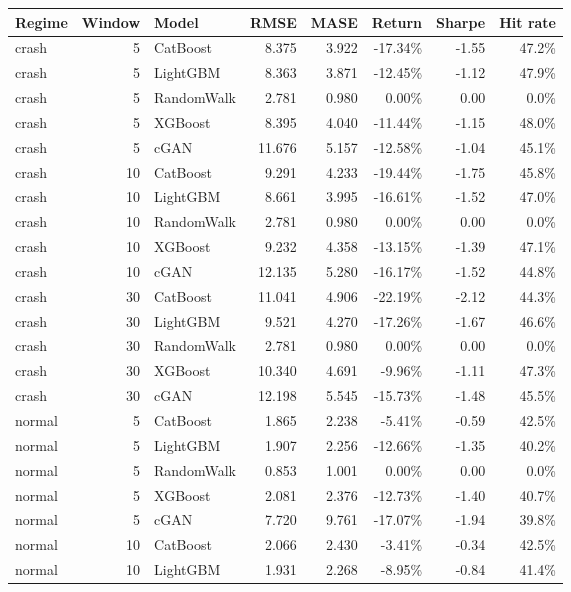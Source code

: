 \documentclass[11pt,a4paper]{article}
\begin{document}
\begin{center}\small
\begin{tabular}{lrlrrrrr}
\toprule
Regime & Window & Model & RMSE & MASE & Return & Sharpe & Hit rate \\
\midrule
crash & 5 & CatBoost & 8.375 & 3.922 & -17.34\% & -1.55 & 47.2\% \\
crash & 5 & LightGBM & 8.363 & 3.871 & -12.45\% & -1.12 & 47.9\% \\
crash & 5 & RandomWalk & 2.781 & 0.980 & 0.00\% & 0.00 & 0.0\% \\
crash & 5 & XGBoost & 8.395 & 4.040 & -11.44\% & -1.15 & 48.0\% \\
crash & 5 & cGAN & 11.676 & 5.157 & -12.58\% & -1.04 & 45.1\% \\
\addlinespace
crash & 10 & CatBoost & 9.291 & 4.233 & -19.44\% & -1.75 & 45.8\% \\
crash & 10 & LightGBM & 8.661 & 3.995 & -16.61\% & -1.52 & 47.0\% \\
crash & 10 & RandomWalk & 2.781 & 0.980 & 0.00\% & 0.00 & 0.0\% \\
crash & 10 & XGBoost & 9.232 & 4.358 & -13.15\% & -1.39 & 47.1\% \\
crash & 10 & cGAN & 12.135 & 5.280 & -16.17\% & -1.52 & 44.8\% \\
\addlinespace
crash & 30 & CatBoost & 11.041 & 4.906 & -22.19\% & -2.12 & 44.3\% \\
crash & 30 & LightGBM & 9.521 & 4.270 & -17.26\% & -1.67 & 46.6\% \\
crash & 30 & RandomWalk & 2.781 & 0.980 & 0.00\% & 0.00 & 0.0\% \\
crash & 30 & XGBoost & 10.340 & 4.691 & -9.96\% & -1.11 & 47.3\% \\
crash & 30 & cGAN & 12.198 & 5.545 & -15.73\% & -1.48 & 45.5\% \\
\addlinespace
normal & 5 & CatBoost & 1.865 & 2.238 & -5.41\% & -0.59 & 42.5\% \\
normal & 5 & LightGBM & 1.907 & 2.256 & -12.66\% & -1.35 & 40.2\% \\
normal & 5 & RandomWalk & 0.853 & 1.001 & 0.00\% & 0.00 & 0.0\% \\
normal & 5 & XGBoost & 2.081 & 2.376 & -12.73\% & -1.40 & 40.7\% \\
normal & 5 & cGAN & 7.720 & 9.761 & -17.07\% & -1.94 & 39.8\% \\
\addlinespace
normal & 10 & CatBoost & 2.066 & 2.430 & -3.41\% & -0.34 & 42.5\% \\
normal & 10 & LightGBM & 1.931 & 2.268 & -8.95\% & -0.84 & 41.4\% \\

\end{tabular}
\end{center}
\end{document}
